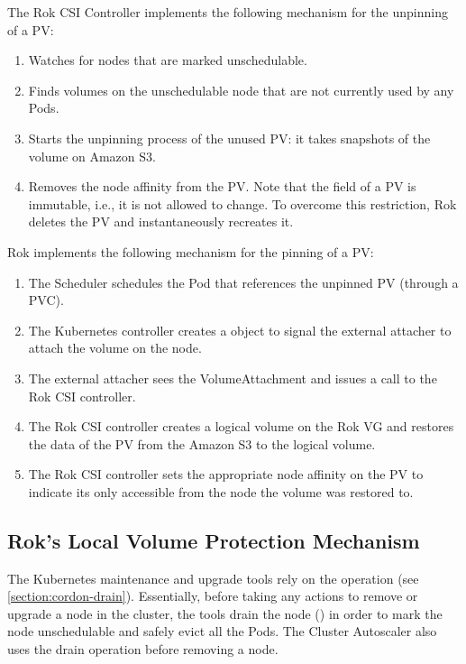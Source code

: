 \label{section:design-unpin}
The Rok CSI Controller implements the following mechanism for the unpinning of a
PV:
\begin{enumerate}
	\tightlist
	\item Watches for nodes that are marked unschedulable.
	\item Finds volumes on the unschedulable node that are not currently used by
	      any Pods.
	\item Starts the unpinning process of the unused PV: it takes snapshots of
	      the volume on Amazon S3.
	\item Removes the node affinity from the PV. Note that the 
	      field of a PV is immutable, i.e., it is not allowed to change. To
	      overcome this restriction, Rok deletes the PV and instantaneously
	      recreates it.
\end{enumerate}

Rok implements the following mechanism for the pinning of a PV:
\begin{enumerate}
	\tightlist
	\item The Scheduler schedules the Pod that references the unpinned PV
	      (through a PVC).
	\item The Kubernetes  controller creates a
	       object to signal the external attacher to attach
	      the volume on the node.
	\item The external attacher sees the VolumeAttachment and issues a
	       call to the Rok CSI controller.
	\item The Rok CSI controller creates a logical volume on the Rok VG and
	      restores the data of the PV from the Amazon S3 to the logical volume.
	\item The Rok CSI controller sets the appropriate node affinity on the PV to
	      indicate its only accessible from the node the volume was restored to.
\end{enumerate}


\subsection{Rok's Local Volume Protection Mechanism}
\label{section:background-rok-csi-guard}

The Kubernetes maintenance and upgrade tools rely on the  operation
(see \ref{section:cordon-drain}). Essentially, before taking any actions to
remove or upgrade a node in the cluster, the tools drain the node () in order to mark the node unschedulable and safely evict all the Pods.
The Cluster Autoscaler also uses the drain operation before removing a node.

